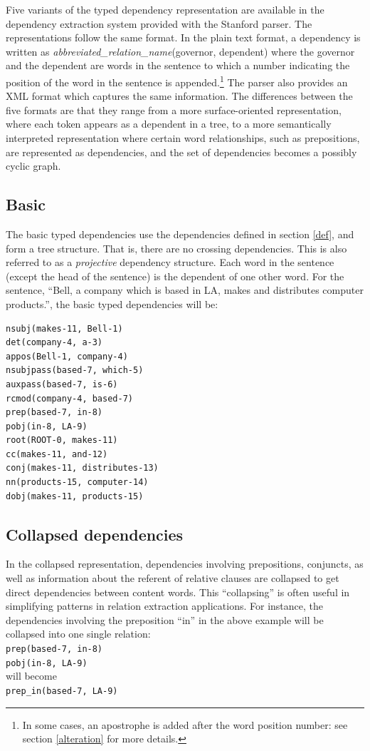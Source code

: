 \documentclass[11pt,letter]{article}
\begin{document}
Five variants of the typed dependency representation are available in the dependency extraction system provided with the Stanford parser. The representations follow the same format.  In the plain text format, a dependency is written as \emph{abbreviated\_relation\_name}(governor, dependent) where the governor and the dependent are words in the sentence to which a number indicating the position of the word in the sentence is appended.\footnote{In some cases, an apostrophe is added after the word position number: see section \ref{alteration} for more details.}  The parser also provides an XML format which captures the same information. The differences between the five formats are that they range from a more surface-oriented representation, where each token appears as a dependent in a tree, to a more semantically interpreted representation where certain word relationships, such as prepositions, are represented as dependencies, and the set of dependencies becomes a possibly cyclic graph.

\subsection{Basic}
The basic typed dependencies use the dependencies defined in section
\ref{def}, and form a tree structure.  That is, there are no crossing
dependencies.  This is also referred to as a \emph{projective} dependency
structure.  Each word in the sentence (except the head of the sentence) is the dependent of one other word.  For the sentence, ``Bell, a company which is based in LA, makes and distributes computer products.'', the basic typed dependencies will be:
\begin{verbatim}
nsubj(makes-11, Bell-1)
det(company-4, a-3)
appos(Bell-1, company-4)
nsubjpass(based-7, which-5)
auxpass(based-7, is-6)
rcmod(company-4, based-7)
prep(based-7, in-8)
pobj(in-8, LA-9)
root(ROOT-0, makes-11)
cc(makes-11, and-12)
conj(makes-11, distributes-13)
nn(products-15, computer-14)
dobj(makes-11, products-15)
\end{verbatim}


\subsection{Collapsed dependencies}

In the collapsed representation,
dependencies involving prepositions, conjuncts, as well as information about the referent of relative clauses are collapsed to get direct dependencies between content words.  This ``collapsing'' is often useful in simplifying patterns in relation extraction applications.
For instance, the dependencies involving the preposition ``in'' in the above example will be collapsed into one single relation:\\
\indent \texttt{prep(based-7, in-8)}\\
\indent \texttt{pobj(in-8, LA-9)}\\
will become\\
\indent \texttt{prep\_in(based-7, LA-9)}
\end{document}

